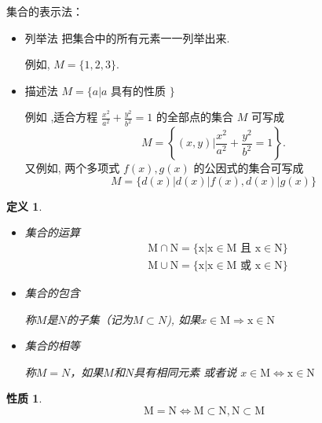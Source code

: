 \documentclass[13pt]{beamer}
\newtheorem*{defi}{定义}
\newtheorem*{prop}{性质}
\begin{document}
\begin{frame}
	集合的表示法：
	
\begin{itemize}
	\item 列举法  \quad 把集合中的所有元素一一列举出来. 

	例如, $M=\{1,2,3\}.$

	\item 描述法  \quad $M=\{a | a \text { 具有的性质 }\}$

例如 ,适合方程 $\frac{x^{2}}{a^{2}}+\frac{y^{2}}{b^{2}}=1$ 的全部点的集合 $M$ 可写成
\[
M=\left\{(x, y) | \frac{x^{2}}{a^{2}}+\frac{y^{2}}{b^{2}}=1\right\}.
\]
又例如, 两个多项式 $f(x), g(x)$ 的公因式的集合可写成
\[
M=\{d(x)|d(x)| f(x), d(x) | g(x)\}
\]

\end{itemize}
\end{frame}

\begin{frame}
\begin{defi}
\begin{itemize}
\item 集合的运算
\[
\begin{aligned}
&\mathrm{M} \cap \mathrm{N}=\{\mathrm{x} | \mathrm{x} \in \mathrm{M} \text { 且 } \mathrm{x} \in \mathrm{N}\}\\
&\mathrm{M} \cup \mathrm{N}=\{\mathrm{x} | \mathrm{x} \in \mathrm{M} \text { 或 } \mathrm{x} \in \mathrm{N}\}
\end{aligned}	
\]

\item 集合的包含 

称$M$是$N$的子集（记为$M \subset N$), 如果$x \in \mathrm{M} \Rightarrow \mathrm{x} \in \mathrm{N}$
\item 
集合的相等

称$M = N$，如果$M$和$N$具有相同元素 或者说 $x \in \mathrm{M} \Leftrightarrow \mathrm{x} \in \mathrm{N}$
\end{itemize}
\end{defi}


\begin{prop}
\[
\mathrm{M}=\mathrm{N} \Leftrightarrow \mathrm{M} \subset \mathrm{N}, \mathrm{N} \subset \mathrm{M}
\]
\end{prop}
\end{frame}
\end{document}

